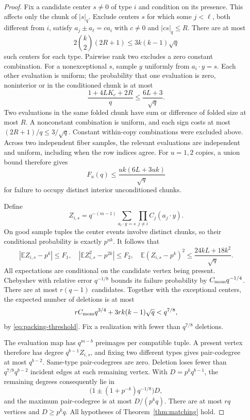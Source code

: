 \documentclass[11pt]{article}
\theoremstyle{remark}
\newcommand{\E}{\mathbb E}
\begin{document}
\begin{proof}
Fix a candidate center $s\ne0$ of type $i$ and condition on its presence.
This affects only the chunk of $|s|_q$. Exclude centers $s$ for which
some $j<\ell$, both different from $i$, satisfy
$a_j\pm a_\ell=c a_i$ with $c\ne0$ and $|cs|_q\le R$.
There are at most
\[
 2\binom{k}{2}(2R+1)\le3k(k-1)\sqrt q
\]
such centers for each type. Pairwise rank two excludes a zero constant
combination. For a nonexceptional $s$, sample $y$ uniformly from
$a_i\cdot y=s$. Each other evaluation is uniform; the probability that
one evaluation is zero, noninterior or in the conditioned chunk is at most
\[
 \frac{1+4LK_c+2R}{q}\le\frac{6L+3}{\sqrt q}.
\]
Two evaluations in the same folded chunk have sum or difference of
folded size at most $R$. A nonconstant combination is uniform, and each
sign costs at most $(2R+1)/q\le3/\sqrt q$. Constant within-copy
combinations were excluded above. Across two independent fiber samples,
the relevant evaluations are independent and uniform, including when the
row indices agree. For $u=1,2$ copies, a union bound therefore gives
\begin{equation}\label{eq:fiber-bad}
 F_u(q)\le\frac{uk(6L+3uk)}{\sqrt q}
\end{equation}
for failure to occupy distinct interior unconditioned chunks.

Define
\[
 Z_{i,s}=q^{-(m-1)}
       \sum_{a_i\cdot y=s}\prod_{j\ne i}C_j(a_j\cdot y).
\]
On good sample tuples the center events involve distinct chunks, so their
conditional probability is exactly $p^{uk}$. It follows that
\[
 |\E Z_{i,s}-p^k|\le F_1,
 \quad |\E Z_{i,s}^2-p^{2k}|\le F_2,
 \quad \E(Z_{i,s}-p^k)^2
      \le\frac{24kL+18k^2}{\sqrt q}.
\]
All expectations are conditional on the candidate vertex being present.
Chebyshev with relative error $q^{-1/8}$ bounds its failure probability
by $C_{\rm mom}q^{-1/4}$. There are at most $r(q-1)$ candidates. Together
with the exceptional centers, the expected number of deletions is at most
\[
 rC_{\rm mom}q^{3/4}+3rk(k-1)\sqrt q<q^{7/8},
\]
by \eqref{eq:packing-threshold}. Fix a realization with fewer than
$q^{7/8}$ deletions.

The evaluation map has $q^{m-b}$ preimages per compatible tuple. A
present vertex therefore has degree $q^{b-1}Z_{i,s}$, and fixing two
different types gives pair-codegree at most $q^{b-2}$. Same-type
pair-codegrees are zero. Deletion loses fewer than
$q^{7/8}q^{b-2}$ incident edges at each remaining vertex. With
$D=p^kq^{b-1}$, the remaining degrees consequently lie in
\[
 \bigl(1\pm(1+p^{-k})q^{-1/8}\bigr)D,
\]
and the maximum pair-codegree is at most $D/(p^kq)$.
There are at most $rq$ vertices and $D\ge p^kq$. All hypotheses of
Theorem~\ref{thm:matching} hold.


\end{proof}
\end{document}
